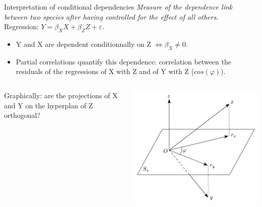 \documentclass[11pt]{beamer}
\newcommand{\emphase}[1]{\textcolor{Complement}{#1}}
\newcommand{\bleu}[1]{\textcolor{Framableulight}{#1}}
\begin{document}
\begin{frame}{Interpretation of conditional dependencies}
\textit{Measure of the dependence link between two species \emphase{after having controlled for the effect of all others}}.  \\
 \bigskip
\bleu{Regression:} $Y=\beta_X X+\beta_Z Z+\varepsilon$.
\begin{itemize}
\item  Y and X are dependent conditionnally on Z $\iff \beta_X \neq 0$.
\item Partial correlations quantify this dependence: correlation between the residuals of the regressions of  X with Z and of Y with Z ($cos(\varphi)$).
\end{itemize}
\begin{columns}
\begin{column}{0.55\linewidth}
\bleu{Graphically:} are the projections of X and Y on the hyperplan of Z orthogonal?

\end{column}
\begin{column}{0.4\linewidth}
\includegraphics[width=0.8\linewidth]{images/pcgeom.png}
\end{column}
\end{columns}
\bigskip


\end{frame}


\end{document}
